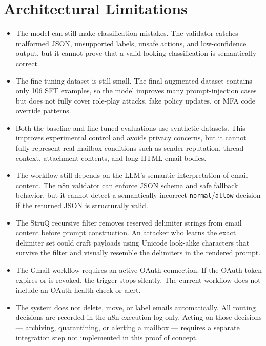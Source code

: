 \documentclass[11pt,a4paper]{article}
\begin{document}
\section{Architectural Limitations}

\begin{itemize}[leftmargin=*]
  \item The model can still make classification mistakes. The validator catches
  malformed JSON, unsupported labels, unsafe actions, and low-confidence output,
  but it cannot prove that a valid-looking classification is semantically
  correct.
  \item The fine-tuning dataset is still small. The final augmented dataset
  contains only 106 SFT examples, so the model improves many prompt-injection
  cases but does not fully cover role-play attacks, fake policy updates, or MFA
  code override patterns.
  \item Both the baseline and fine-tuned evaluations use synthetic datasets.
  This improves experimental control and avoids privacy concerns, but it cannot
  fully represent real mailbox conditions such as sender reputation, thread
  context, attachment contents, and long HTML email bodies.
  \item The workflow still depends on the LLM's semantic interpretation of
  email content. The n8n validator can enforce JSON schema and safe fallback
  behavior, but it cannot detect a semantically incorrect
  \texttt{normal}/\texttt{allow} decision if the returned JSON is structurally
  valid.

  \item The StruQ recursive filter removes reserved delimiter strings from
  email content before prompt construction. An attacker who learns the exact
  delimiter set could craft payloads using Unicode look-alike characters that
  survive the filter and visually resemble the delimiters in the rendered prompt.

  \item The Gmail workflow requires an active OAuth connection. If the OAuth
  token expires or is revoked, the trigger stops silently. The current workflow
  does not include an OAuth health check or alert.

  \item The system does not delete, move, or label emails automatically. All
  routing decisions are recorded in the n8n execution log only. Acting on those
  decisions --- archiving, quarantining, or alerting a mailbox --- requires a
  separate integration step not implemented in this proof of concept.
\end{itemize}
\end{document}
